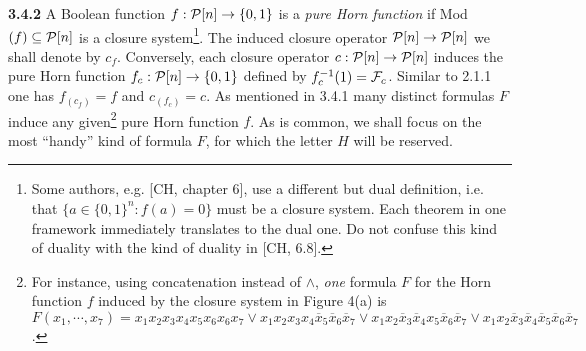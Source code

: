 \documentclass[11pt]{article}
\newcommand{\ol}{\overline}
\newcommand{\ra}{\rightarrow}
\begin{document}
{\bf 3.4.2} A Boolean function $f: {\cal P}[n] \ra \{0,1\}$ is a {\it pure Horn function} if Mod$(f) \subseteq {\cal P}[n]$ is a closure system\footnote{Some authors, e.g. [CH, chapter 6], use a different but dual definition, i.e. that $\{a \in \{0,1\}^n: f(a) =0 \}$ must be a closure system. Each theorem in one framework immediately translates to the dual one. Do not confuse this kind of duality with the kind of duality in [CH, 6.8].}. 
The induced closure operator ${\cal P}[n] \ra {\cal P}[n]$ we shall denote by $c_f$. Conversely, each closure operator $c: {\cal P}[n] \ra {\cal P}[n]$ induces the pure Horn function $f_c: {\cal P}[n] \ra \{0,1\}$ defined by $f_c^{-1} (1) = {\cal F}_c$. Similar to 2.1.1 one has $f_{(c_f)} =f$ and $c_{(f_c)} = c$. As mentioned in 3.4.1 many distinct formulas $F$ induce any given\footnote{For instance, using concatenation instead of $\wedge$, {\it one} formula $F$ for the Horn function $f$ induced by the closure system in Figure 4(a) is  $F(x_1, \cdots, x_7) = x_1 x_2 x_3 x_4 x_5 x_6 x_6 x_7 \vee x_1 x_2 x_3 x_4 \ol{x}_5 \ol{x}_6 \ol{x}_7 \vee x_1 x_2 \ol{x}_3 \ol{x}_4 x_5 \ol{x}_6 \ol{x}_7 \vee x_1 x_2 \ol{x}_3 \ol{x}_4 \ol{x}_5 \ol{x}_6 \ol{x}_7$.} pure Horn function $f$. 
As is common, we shall focus on the most ``handy'' kind of formula $F$, for which the letter $H$ will be reserved. 
\end{document}

